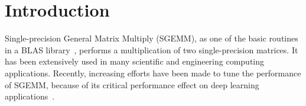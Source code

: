 \section{Introduction}
Single-precision General Matrix Multiply (SGEMM), as one 
of the basic routines in a BLAS library~\cite{blas,intel2007intel,amd2014}, performs a multiplication of two single-precision matrices. 
It has been extensively used in many scientific and engineering 
computing applications. 
Recently, increasing efforts have been made to tune the performance of SGEMM, because of its critical performance effect on deep learning applications~\cite{chetlur2014cudnn,nervana_sgemm_wiki}.

